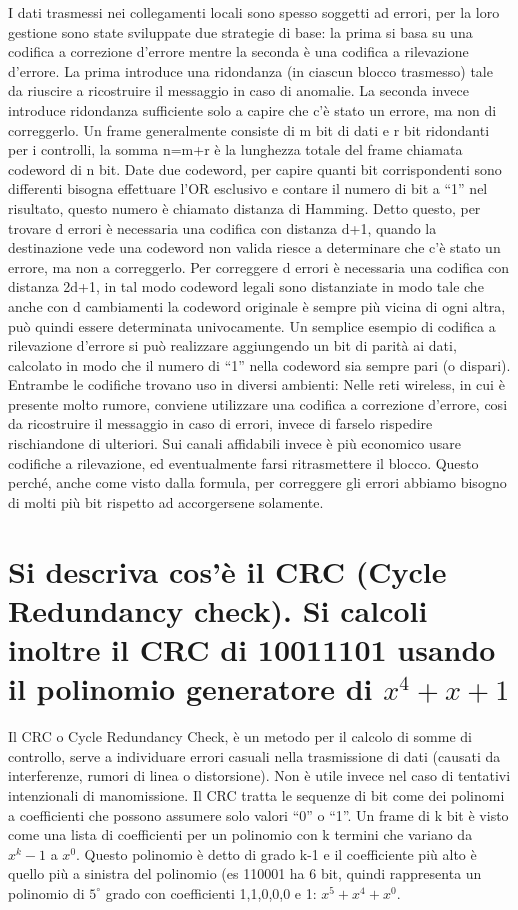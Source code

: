 I dati trasmessi nei collegamenti locali sono spesso soggetti ad errori, per la loro gestione sono state sviluppate due strategie di base: la prima si basa su una codifica a correzione d'errore mentre la seconda è una codifica a rilevazione d'errore.
La prima introduce una ridondanza (in ciascun blocco trasmesso) tale da riuscire a ricostruire il messaggio in caso di anomalie. La seconda invece introduce ridondanza sufficiente solo a capire che c'è stato un errore, ma non di correggerlo.
Un frame generalmente consiste di m bit di dati e r bit ridondanti per i controlli, la somma n=m+r è la lunghezza totale del frame chiamata codeword di n bit. Date due codeword, per capire quanti bit corrispondenti sono differenti bisogna effettuare l'OR esclusivo e contare il numero di bit a “1” nel risultato, questo numero è chiamato distanza di Hamming.
Detto questo, per trovare d errori è necessaria una codifica con distanza d+1, quando la destinazione vede una codeword non valida riesce a determinare che c'è stato un errore, ma non a correggerlo.
Per correggere d errori è necessaria una codifica con distanza 2d+1, in tal modo codeword legali sono distanziate in modo tale che anche con d cambiamenti la codeword originale è sempre più vicina di ogni altra, può quindi essere determinata univocamente.
Un semplice esempio di codifica a rilevazione d'errore si può realizzare aggiungendo un bit di parità ai dati, calcolato in modo che il numero di “1” nella codeword sia sempre pari (o dispari).
Entrambe le codifiche trovano uso in diversi ambienti:
Nelle reti wireless, in cui è presente molto rumore, conviene utilizzare una codifica a correzione d'errore, cosi da ricostruire il messaggio in caso di errori, invece di farselo rispedire rischiandone di ulteriori. 
Sui canali affidabili invece è più economico usare codifiche a rilevazione, ed eventualmente farsi ritrasmettere il blocco.
Questo perché, anche come visto dalla formula, per correggere gli errori abbiamo bisogno di molti più bit rispetto ad accorgersene solamente.

\section{Si descriva cos'è il CRC (Cycle Redundancy check). Si calcoli inoltre il CRC di 10011101 usando il polinomio generatore di $x^4+x+1$}

Il CRC o Cycle Redundancy Check, è un metodo per il calcolo di somme di controllo, serve a individuare errori casuali nella trasmissione di dati (causati da interferenze, rumori di linea o distorsione). Non è utile invece nel caso di tentativi intenzionali di manomissione.
Il CRC tratta le sequenze di bit come dei polinomi a coefficienti che possono assumere solo valori “0” o “1”. Un frame di k bit è visto come una lista di coefficienti per un polinomio con k termini che variano da $x^k-1$ a $x^0$. Questo polinomio è detto di grado k-1 e il coefficiente più alto è quello più a sinistra del polinomio (es 110001 ha 6 bit, quindi rappresenta un polinomio di $5^{\circ}$ grado con coefficienti 1,1,0,0,0 e 1: $x^5+x^4+x^0$.

